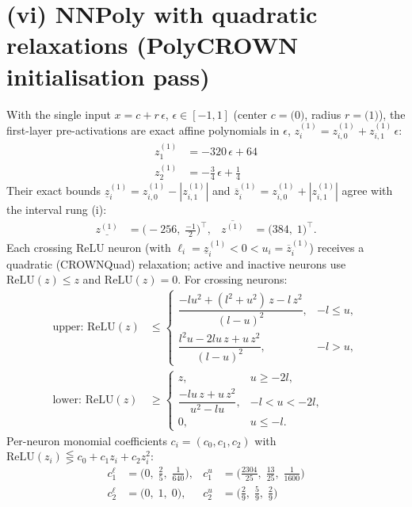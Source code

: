 \documentclass[11pt]{article}
\begin{document}
\section{(vi) NNPoly with quadratic relaxations (PolyCROWN initialisation pass)}
With the single input $x = c + r\,\epsilon$, $\epsilon \in [-1, 1]$ (center $c = \bigl(0\bigr)$, radius $r = \bigl(1\bigr)$), the first-layer pre-activations are exact affine polynomials in $\epsilon$, $z^{(1)}_i = z^{(1)}_{i,0} + z^{(1)}_{i,1}\,\epsilon$:
\begin{align*}
z^{(1)}_{1} &= -320\,\epsilon + 64 \\
z^{(1)}_{2} &= -\frac{3}{4}\,\epsilon + \frac{1}{4}
\end{align*}
Their exact bounds $\underline{z}^{(1)}_i = z^{(1)}_{i,0} - |z^{(1)}_{i,1}|$ and $\overline{z}^{(1)}_i = z^{(1)}_{i,0} + |z^{(1)}_{i,1}|$ agree with the interval rung (i):
\begin{align*}
\underline{z^{(1)}} &= \bigl(-256,\; \frac{-1}{2}\bigr)^{\!\top}, & \overline{z^{(1)}} &= \bigl(384,\; 1\bigr)^{\!\top}.
\end{align*}
Each crossing ReLU neuron (with $\ell_i = \underline{z}^{(1)}_i < 0 < u_i = \overline{z}^{(1)}_i$)
receives a quadratic (CROWNQuad) relaxation; active and inactive neurons use $\mathrm{ReLU}(z) \le z$
and $\mathrm{ReLU}(z) = 0$. For crossing neurons:
\begin{align*}
\text{upper: } \mathrm{ReLU}(z) &\le \begin{cases} \dfrac{-l u^2 + (l^2 + u^2)\, z - l\, z^2}{(l - u)^2}, & -l \le u, \\[3mm] \dfrac{l^2 u - 2 l u\, z + u\, z^2}{(l - u)^2}, & -l > u, \end{cases} \\[2mm]
\text{lower: } \mathrm{ReLU}(z) &\ge \begin{cases} z, & u \ge -2l, \\[3mm] \dfrac{-l u\, z + u\, z^2}{u^2 - l u}, & -l < u < -2l, \\[3mm] 0, & u \le -l. \end{cases}
\end{align*}
Per-neuron monomial coefficients $c_i = (c_0, c_1, c_2)$ with $\mathrm{ReLU}(z_i) \lesseqgtr c_0 + c_1 z_i + c_2 z_i^2$:
\begin{align*}
c^{\ell}_{1} &= \bigl(0,\; \frac{2}{5},\; \frac{1}{640}\bigr), & c^{u}_{1} &= \bigl(\frac{2304}{25},\; \frac{13}{25},\; \frac{1}{1600}\bigr) \\
c^{\ell}_{2} &= \bigl(0,\; 1,\; 0\bigr), & c^{u}_{2} &= \bigl(\frac{2}{9},\; \frac{5}{9},\; \frac{2}{9}\bigr)
\end{align*}
\end{document}
